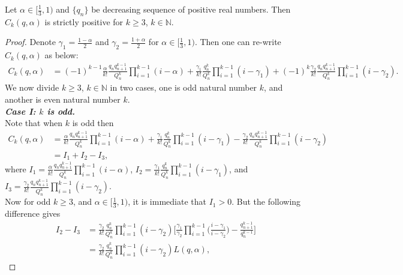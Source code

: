 \documentclass[10pt,a4paper]{amsart}
\begin{document}
\begin{Lemma}{\label{Positive}}
Let $\alpha\in[\frac{1}{3},1)$ and $\{q_{n}\}$ be decreasing sequence of positive real numbers. Then $C_{k}(q,\alpha)$ is strictly positive for $k\geq3$, $k\in\mathbb{N}$.
\end{Lemma}

\begin{proof}
Denote $\gamma_{1}=\frac{1-\alpha}{2}$ and $\gamma_{2}=\frac{1+\alpha}{2}$ for $\alpha\in[\frac{1}{3},1)$. Then one can re-write $C_{k}(q,\alpha)$ as below:
\begin{align*}
C_{k}(q,\alpha)&=(-1)^{k-1}\frac{\alpha}{k!}\frac{q_{n}q_{n+1}^{k-1}}{Q_{n}^{k}}\displaystyle\prod_{i=1}^{k-1}(i-\alpha)
+\frac{\gamma_{1}}{k!}\frac{q_{n}^{k}}{Q_{n}^{k}}\displaystyle\prod_{i=1}^{k-1}(i-\gamma_{1})+(-1)^{k}\frac{\gamma_{2}}{k!}
\frac{q_{n}q_{n+1}^{k-1}}{Q_{n}^{k}}\displaystyle\prod_{i=1}^{k-1}(i-\gamma_{2}).
\end{align*}
We now divide $k\geq 3$, $k\in\mathbb{N}$ in two cases, one is odd natural number $k$, and another is even natural number $k$.\\
\emph{\textbf{Case I: $k$ is odd.}}\\
Note that when $k$ is odd then
\begin{align*}
C_{k}(q,\alpha)&=\frac{\alpha}{k!}\frac{q_{n}q_{n+1}^{k-1}}{Q_{n}^{k}}\displaystyle\prod_{i=1}^{k-1}(i-\alpha)
+\frac{\gamma_{1}}{k!}\frac{q_{n}^{k}}{Q_{n}^{k}}\displaystyle\prod_{i=1}^{k-1}(i-\gamma_{1})-\frac{\gamma_{2}}{k!}
\frac{q_{n}q_{n+1}^{k-1}}{Q_{n}^{k}}\displaystyle\prod_{i=1}^{k-1}(i-\gamma_{2})\\
&=I_{1}+I_{2}-I_{3},
\end{align*}where
$I_{1}=\frac{\alpha}{k!}\frac{q_{n}q_{n+1}^{k-1}}{Q_{n}^{k}}\displaystyle\prod_{i=1}^{k-1}(i-\alpha)$,
$I_{2}=\frac{\gamma_{1}}{k!}\frac{q_{n}^{k}}{Q_{n}^{k}}\displaystyle\prod_{i=1}^{k-1}(i-\gamma_{1})$, and
$I_{3}=\frac{\gamma_{2}}{k!}\frac{q_{n}q_{n+1}^{k-1}}{Q_{n}^{k}}\displaystyle\prod_{i=1}^{k-1}(i-\gamma_{2}).$\\
Now for odd $k\geq3$, and $\alpha\in[\frac{1}{3},1)$, it is immediate that $I_{1}>0$. But the following difference gives
\begin{align*}
I_{2}-I_{3}&=\frac{\gamma_{2}}{k!}\frac{q_{n}^{k}}{Q_{n}^{k}}\displaystyle\prod_{i=1}^{k-1}(i-\gamma_{2})\Big[\frac{\gamma_{1}}{\gamma_{2}}\displaystyle\prod_{i=1}^{k-1}
\big(\frac{i-\gamma_{1}}{i-\gamma_{2}}\big)-\frac{q_{n+1}^{k-1}}{q_{n}^{k-1}}\Big]\\
&=\frac{\gamma_{2}}{k!}\frac{q_{n}^{k}}{Q_{n}^{k}}\displaystyle\prod_{i=1}^{k-1}(i-\gamma_{2})L(q,\alpha),

\end{align*}
\end{proof}
\end{document}
